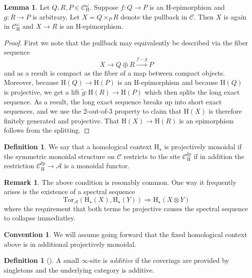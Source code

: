 \documentclass[10pt]{amsart}
\theoremstyle{definition}
\numberwithin{figure}{section}
\numberwithin{equation}{section}
\newtheorem{lemma}[figure]{Lemma}
\newtheorem{definition}[figure]{Definition}
\newtheorem{remark}[figure]{Remark}
\newtheorem{convention}[figure]{Convention}
\newcommand{\cA}{\mathcal{A}}
\newcommand{\cC}{\mathcal{C}}
\theoremstyle{cited}
\newcommand{\fp}{\mathrm{fp}}
\renewcommand{\H}{\mathrm{H}}
\newcommand{\Tor}{\mathrm{Tor}}
\begin{document}
\begin{lemma}
  \label{lem:sitepullbacks}
  Let $Q,R,P\in \cC^\omega_\H$. Suppose $f:Q\to P$ is an $\H$-epimorphism and $g:R\to P$ is arbitrary. Let $X=Q\times_P R$ denote the pullback in $\cC$. Then $X$ is again in $\cC^\omega_\H$ and $X\to R$ is an $\H$-epimorphism.
\end{lemma}

\begin{proof}
  First we note that the pullback may equivalently be described via the fiber sequence
  \[
  X\to Q\oplus R \xrightarrow{f-g} P
  \]
  and as a result is compact as the fiber of a map between compact objects. Moreover, because $\H(Q)\to \H(P)$ is an $\H$-epimorphism and because $\H(Q)$ is projective, we get a lift $\tilde g:\H(R)\to \H(P)$ which then splits the long exact sequence. As a result, the long exact sequence breaks up into short exact sequences, and we use the 2-out-of-3 property to claim that $\H(X)$ is therefore finitely generated and projective. That $\H(X)\to \H(R)$ is an epimorphism follows from the splitting.
\end{proof}

\begin{definition}
  We say that a homological context $\H_\star$ is projectively monoidal if 
  the symmetric monoidal structure on $\cC$ restricts to the site $\cC^\fp_\H$ if in addition the restriction $\cC^\fp_\H\to \cA$ is a monoidal functor.
\end{definition}

\begin{remark}
  The above condition is resonably common. One way it frequently arises is the existence of a spectral sequence 
  \[
  \Tor_{\cA}(\H_\star(X),\H_\star(Y))\Rightarrow \H_\star(X\otimes Y)
  \]
  where the requirement that both terms be projective causes the spectral sequence to collapse immediatley.
\end{remark}

\begin{convention}\label{conv:projectivemonoidality}
  We will assume going forward that the fixed homological context above is in additional projectively monoidal.
\end{convention}

\begin{definition}[\cite{Pst22}]
  A small $\infty$-site is \textit{additive} if the coverings are provided by singletons and the underlying category is additive. 
\end{definition}
\end{document}
